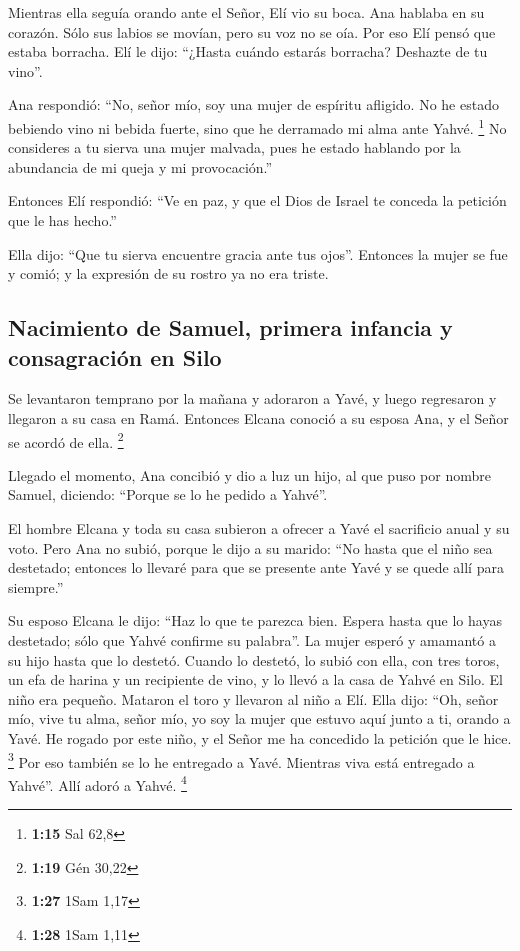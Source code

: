 \begin{paracol}{2}
 Mientras ella seguía orando ante el Señor, Elí vio su
boca.  Ana hablaba en su corazón. Sólo sus labios se
movían, pero su voz no se oía. Por eso Elí pensó que estaba borracha.
 Elí le dijo: ``¿Hasta cuándo estarás borracha? Deshazte
de tu vino''.

 Ana respondió: ``No, señor mío, soy una mujer de
espíritu afligido. No he estado bebiendo vino ni bebida fuerte, sino que
he derramado mi alma ante Yahvé. \footnote{\textbf{1:15} Sal 62,8}
 No consideres a tu sierva una mujer malvada, pues he
estado hablando por la abundancia de mi queja y mi provocación.''

 Entonces Elí respondió: ``Ve en paz, y que el Dios de
Israel te conceda la petición que le has hecho.''

 Ella dijo: ``Que tu sierva encuentre gracia ante tus
ojos''. Entonces la mujer se fue y comió; y la expresión de su rostro ya
no era triste.

\hypertarget{nacimiento-de-samuel-primera-infancia-y-consagraciuxf3n-en-silo}{%
\subsection{Nacimiento de Samuel, primera infancia y consagración en
Silo}\label{nacimiento-de-samuel-primera-infancia-y-consagraciuxf3n-en-silo}}

 Se levantaron temprano por la mañana y adoraron a Yavé,
y luego regresaron y llegaron a su casa en Ramá. Entonces Elcana conoció
a su esposa Ana, y el Señor se acordó de ella. \footnote{\textbf{1:19}
  Gén 30,22}

 Llegado el momento, Ana concibió y dio a luz un hijo, al
que puso por nombre Samuel, diciendo: ``Porque se lo he pedido a
Yahvé''.

 El hombre Elcana y toda su casa subieron a ofrecer a
Yavé el sacrificio anual y su voto.  Pero Ana no subió,
porque le dijo a su marido: ``No hasta que el niño sea destetado;
entonces lo llevaré para que se presente ante Yavé y se quede allí para
siempre.''

 Su esposo Elcana le dijo: ``Haz lo que te parezca bien.
Espera hasta que lo hayas destetado; sólo que Yahvé confirme su
palabra''. La mujer esperó y amamantó a su hijo hasta que lo destetó.
 Cuando lo destetó, lo subió con ella, con tres toros, un
efa de harina y un recipiente de vino, y lo llevó a la casa de Yahvé en
Silo. El niño era pequeño.  Mataron el toro y llevaron al
niño a Elí.  Ella dijo: ``Oh, señor mío, vive tu alma,
señor mío, yo soy la mujer que estuvo aquí junto a ti, orando a Yavé.
 He rogado por este niño, y el Señor me ha concedido la
petición que le hice. \footnote{\textbf{1:27} 1Sam 1,17} 
Por eso también se lo he entregado a Yavé. Mientras viva está entregado
a Yahvé''. Allí adoró a Yahvé. \footnote{\textbf{1:28} 1Sam 1,11}


\end{paracol}
